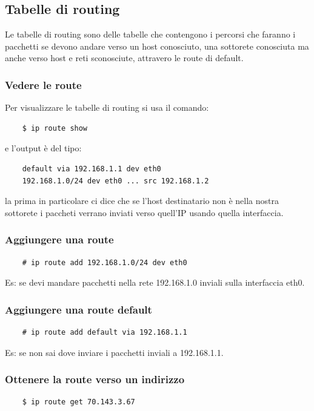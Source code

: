 \subsection{Tabelle di routing}
Le tabelle di routing sono delle tabelle che contengono i percorsi che faranno i pacchetti se devono andare verso un host conosciuto, una sottorete conosciuta ma anche verso host e reti sconosciute, attravero le route di default.

\subsubsection{Vedere le route}
Per visualizzare le tabelle di routing si usa il comando:
\begin{verbatim}
    $ ip route show
\end{verbatim}
e l'output è del tipo:
\begin{verbatim}
    default via 192.168.1.1 dev eth0
    192.168.1.0/24 dev eth0 ... src 192.168.1.2
\end{verbatim}
la prima in particolare ci dice che se l'host destinatario non è nella nostra sottorete i paccheti verrano inviati verso quell'IP usando quella interfaccia.

\subsubsection{Aggiungere una route}
\begin{verbatim}
    # ip route add 192.168.1.0/24 dev eth0
\end{verbatim}
Es: se devi mandare pacchetti nella rete 192.168.1.0 inviali sulla interfaccia eth0.

\subsubsection{Aggiungere una route default}
\begin{verbatim}
    # ip route add default via 192.168.1.1
\end{verbatim}
Es: se non sai dove inviare i pacchetti inviali a 192.168.1.1.

\subsubsection{Ottenere la route verso un indirizzo}
\begin{verbatim}
    $ ip route get 70.143.3.67
\end{verbatim}

